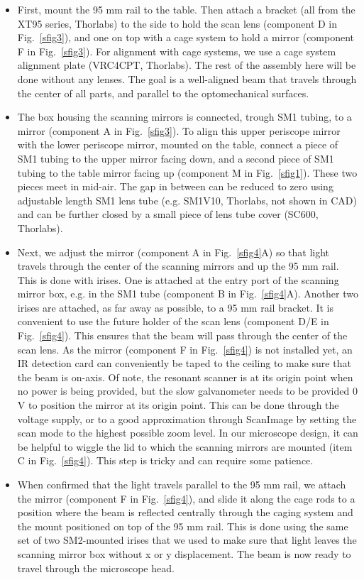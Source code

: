 \documentclass[10pt,letterpaper]{article}
\begin{document}
\begin{itemize}
    \item First, mount the 95 mm rail to the table. Then attach a bracket (all from the XT95 series, Thorlabs) to the side to hold the scan lens (component D in Fig.~\ref{sfig3}), and one on top with a cage system to hold a mirror (component F in Fig.~\ref{sfig3}). For alignment with cage systems, we use a cage system alignment plate (VRC4CPT, Thorlabs). The rest of the assembly here will be done without any lenses. The goal is a well-aligned beam that travels through the center of all parts, and parallel to the optomechanical surfaces.
    \item The box housing the scanning mirrors is connected, trough SM1 tubing, to a mirror (component A in Fig.~\ref{sfig3}). To align this upper periscope mirror with the lower periscope mirror, mounted on the table, connect a piece of SM1 tubing to the upper mirror facing down, and  a second piece of SM1 tubing to the table mirror facing up (component M in Fig.~\ref{sfig1}). These two pieces meet in mid-air. The gap in between can be reduced to zero using adjustable length SM1 lens tube (e.g. SM1V10, Thorlabs, not shown in CAD) and can be further closed by a small piece of  lens tube cover (SC600, Thorlabs). 
    \item Next, we adjust the mirror (component A in Fig.~\ref{sfig4}A) so that light travels through the center of the scanning mirrors and up the 95 mm rail. This is done with irises. One is attached at the entry port of the scanning mirror box, e.g. in the SM1 tube (component B in Fig.~\ref{sfig4}A). Another two irises are attached, as far away as possible, to a 95 mm rail bracket. It is convenient to use the future holder of the scan lens (component D/E in Fig.~\ref{sfig4}). This ensures that the beam will pass through the center of the scan lens. As the mirror (component F in Fig.~\ref{sfig4}) is not installed yet, an IR detection card can conveniently be taped to the ceiling to make sure that the beam is on-axis. Of note, the resonant scanner is at its origin point when no power is being provided, but the slow galvanometer needs to be provided 0 V to position the mirror at its origin point. This can be done through the voltage supply, or to a good approximation through ScanImage by setting the scan mode to the highest possible zoom level. In our microscope design, it can be helpful to wiggle the lid to which the scanning mirrors are mounted (item C in Fig.~\ref{sfig4}). This step is tricky and can require some patience. 
    \item When confirmed that the light travels parallel to the 95 mm rail, we attach the mirror (component F in Fig.~\ref{sfig4}), and slide it along the cage rods to a position where the beam is reflected centrally through the caging system and the mount positioned on top of the 95 mm rail. This is done using the same set of two SM2-mounted irises that we used to make sure that light leaves the scanning mirror box without x or y displacement. The beam is now ready to travel through the microscope head.
\end{itemize}
\end{document}
